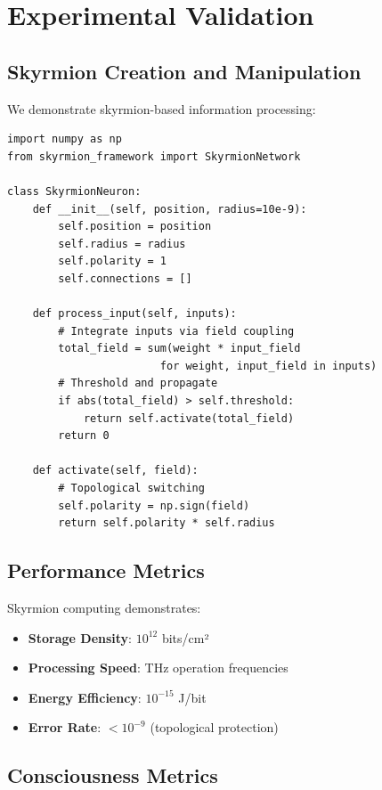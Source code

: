 \documentclass[12pt,a4paper]{article}
\begin{document}
\section{Experimental Validation}

\subsection{Skyrmion Creation and Manipulation}

We demonstrate skyrmion-based information processing:

\begin{lstlisting}[caption=Skyrmion Neural Network Simulation]
import numpy as np
from skyrmion_framework import SkyrmionNetwork

class SkyrmionNeuron:
    def __init__(self, position, radius=10e-9):
        self.position = position
        self.radius = radius
        self.polarity = 1
        self.connections = []

    def process_input(self, inputs):
        # Integrate inputs via field coupling
        total_field = sum(weight * input_field
                        for weight, input_field in inputs)
        # Threshold and propagate
        if abs(total_field) > self.threshold:
            return self.activate(total_field)
        return 0

    def activate(self, field):
        # Topological switching
        self.polarity = np.sign(field)
        return self.polarity * self.radius
\end{lstlisting}

\subsection{Performance Metrics}

Skyrmion computing demonstrates:
\begin{itemize}
    \item \textbf{Storage Density}: $10^{12}$ bits/cm²
    \item \textbf{Processing Speed}: THz operation frequencies
    \item \textbf{Energy Efficiency}: $10^{-15}$ J/bit
    \item \textbf{Error Rate}: $< 10^{-9}$ (topological protection)
\end{itemize}

\subsection{Consciousness Metrics}
\end{document}
